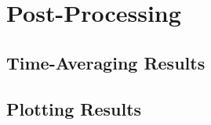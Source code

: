 \section{Post-Processing}

\subsection{Time-Averaging Results}

\noindent{}

\subsection{Plotting Results}

